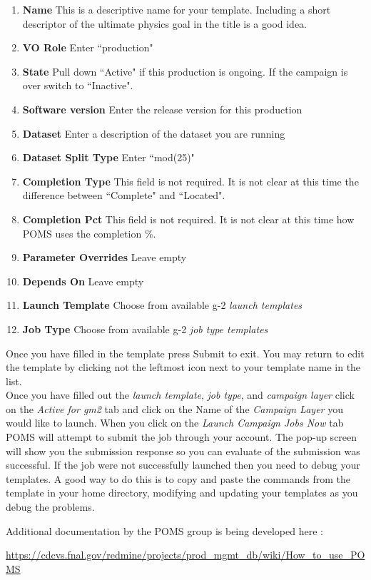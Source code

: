 \begin{enumerate}
\item[]{\bf{Name}} This is a descriptive name for your template. Including a short descriptor of the ultimate physics goal in the title is a good idea.
\item[]{\bf{VO Role}} Enter ``production"
\item[]{\bf{State}} Pull down ``Active" if this production is ongoing. If the campaign is over switch to ``Inactive".
\item[]{\bf{Software version}} Enter the release version for this production
\item[]{\bf{Dataset}} Enter a description of the dataset you are running
\item[]{\bf{Dataset Split Type}} Enter ``mod(25)"
\item[]{\bf{Completion Type}}  This field is not required. It is not clear at this time the difference between ``Complete" and ``Located".
\item[]{\bf{Completion Pct}} This field is not required. It is not clear at this time how POMS uses the completion $\%$.
\item[]{\bf{Parameter Overrides}} Leave empty
\item[]{\bf{Depends On}} Leave empty
\item[]{\bf{Launch Template}} Choose from available g-2 {\it {launch templates}}
\item[]{\bf{Job Type}} Choose from available g-2 {\it {job type templates}}
\end{enumerate}

\noindent Once you have filled in the template press Submit to exit. You may return to edit the template by clicking not the leftmost icon next to your template name in the list.\\

\noindent Once you have filled out the  {\it{launch template}}, {\it{job type}}, and {\it{campaign layer}} click on the {\it{Active for gm2}}  tab and click on the Name of the {\it{Campaign Layer}} you would like to launch. When you click on the {\it{Launch Campaign Jobs Now}} tab POMS will attempt to submit the job through your account. The pop-up screen will show you the submission response so you can evaluate of the submission was successful. If the job were not successfully launched then you need to debug your templates. A good way to do this is to copy and paste the commands from the template in your home directory, modifying and updating your templates as you debug the problems.  

\noindent Additional documentation by the POMS group is being developed here : 
\begin{center}
{\footnotesize
\url{https://cdcvs.fnal.gov/redmine/projects/prod_mgmt_db/wiki/How_to_use_POMS}}
\end{center}



